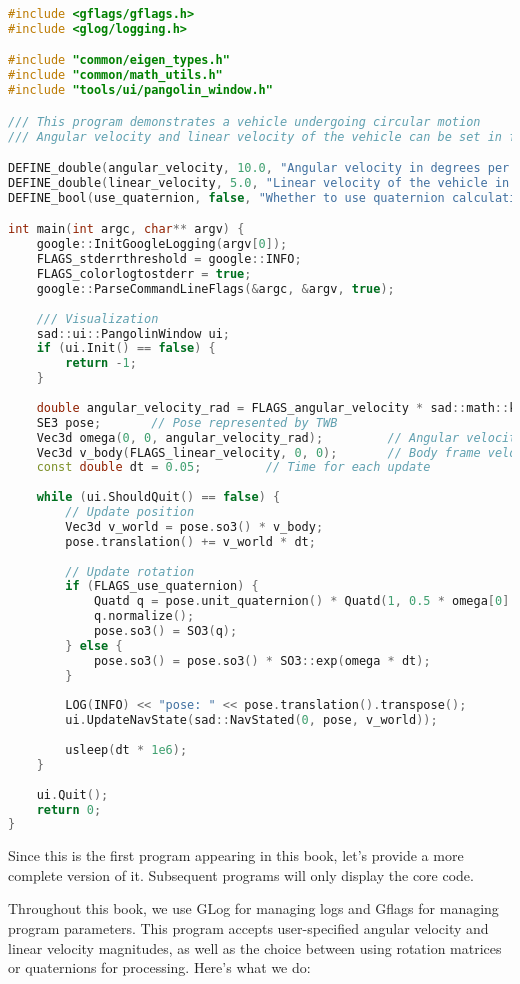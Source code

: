 \begin{lstlisting}[language=c++,caption=src/ch2/motion.cc]
#include <gflags/gflags.h>
#include <glog/logging.h>

#include "common/eigen_types.h"
#include "common/math_utils.h"
#include "tools/ui/pangolin_window.h"

/// This program demonstrates a vehicle undergoing circular motion
/// Angular velocity and linear velocity of the vehicle can be set in flags

DEFINE_double(angular_velocity, 10.0, "Angular velocity in degrees per second");
DEFINE_double(linear_velocity, 5.0, "Linear velocity of the vehicle in m/s");
DEFINE_bool(use_quaternion, false, "Whether to use quaternion calculations");

int main(int argc, char** argv) {
	google::InitGoogleLogging(argv[0]);
	FLAGS_stderrthreshold = google::INFO;
	FLAGS_colorlogtostderr = true;
	google::ParseCommandLineFlags(&argc, &argv, true);
	
	/// Visualization
	sad::ui::PangolinWindow ui;
	if (ui.Init() == false) {
		return -1;
	}
	
	double angular_velocity_rad = FLAGS_angular_velocity * sad::math::kDEG2RAD;  // Angular velocity in radians
	SE3 pose;		// Pose represented by TWB
	Vec3d omega(0, 0, angular_velocity_rad);         // Angular velocity vector
	Vec3d v_body(FLAGS_linear_velocity, 0, 0);		 // Body frame velocity
	const double dt = 0.05;			// Time for each update
	
	while (ui.ShouldQuit() == false) {
		// Update position
		Vec3d v_world = pose.so3() * v_body;
		pose.translation() += v_world * dt;
		
		// Update rotation
		if (FLAGS_use_quaternion) {
			Quatd q = pose.unit_quaternion() * Quatd(1, 0.5 * omega[0] * dt, 0.5 * omega[1] * dt, 0.5 * omega[2] * dt);
			q.normalize();
			pose.so3() = SO3(q);
		} else {
			pose.so3() = pose.so3() * SO3::exp(omega * dt);
		}
		
		LOG(INFO) << "pose: " << pose.translation().transpose();
		ui.UpdateNavState(sad::NavStated(0, pose, v_world));
		
		usleep(dt * 1e6);
	}
	
	ui.Quit();
	return 0;
}
\end{lstlisting}

Since this is the first program appearing in this book, let's provide a more complete version of it. Subsequent programs will only display the core code.

Throughout this book, we use GLog for managing logs and Gflags for managing program parameters. This program accepts user-specified angular velocity and linear velocity magnitudes, as well as the choice between using rotation matrices or quaternions for processing. Here's what we do:


